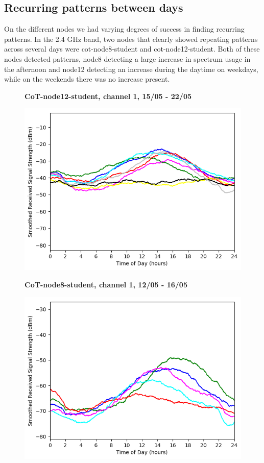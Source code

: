 \documentclass[a4paper, 11pt]{article}
\begin{document}
\subsection{Recurring patterns between days} 
On the different nodes we had varying degrees of success in finding recurring patterns. In the 2.4 GHz band, two nodes that clearly showed repeating patterns across several days were cot-node8-student and cot-node12-student. Both of these nodes detected patterns, node8 detecting a large increase in spectrum usage in the afternoon and node12 detecting an increase during the daytime on weekdays, while on the weekends there was no increase present. 
\begin{figure}[!htb]
    \centering
    \textbf{CoT-node12-student, channel 1, 15/05 - 22/05}\par\medskip
	\includegraphics[scale=0.5]{images/2_4_GHz/cot-node12-student_2017-05-22_chan1_image.png}
\end{figure}
\begin{figure}[htb!]
    \centering
    \textbf{CoT-node8-student, channel 1, 12/05 - 16/05}\par\medskip
	\includegraphics[scale=0.5]{images/2_4_GHz/cot-node8-student_2017-05-16_chan1_image.png}
\end{figure}
\end{document}
